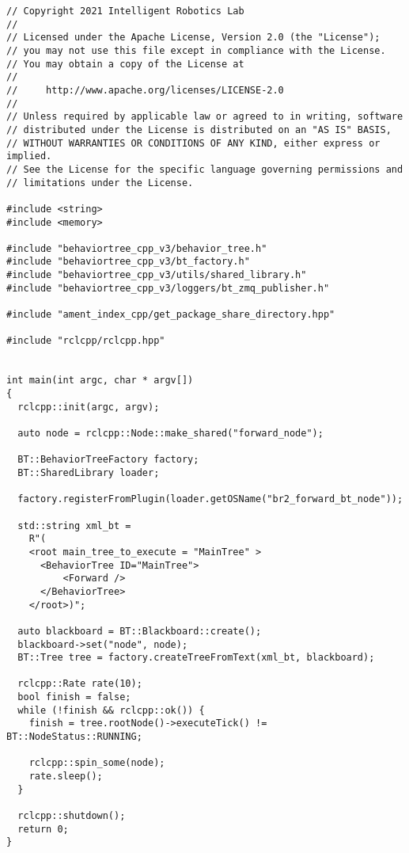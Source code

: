  \footnotesize
\begin{tcolorbox}[sharp corners, colframe=gray!80, colback=LightGray, left=0pt, top=0pt, bottom=0pt, title=\texttt{br2\_bt\_bumpgo/tests/bt\_forward\_main.cpp}]
  \begin{verbatim}
// Copyright 2021 Intelligent Robotics Lab
//
// Licensed under the Apache License, Version 2.0 (the "License");
// you may not use this file except in compliance with the License.
// You may obtain a copy of the License at
//
//     http://www.apache.org/licenses/LICENSE-2.0
//
// Unless required by applicable law or agreed to in writing, software
// distributed under the License is distributed on an "AS IS" BASIS,
// WITHOUT WARRANTIES OR CONDITIONS OF ANY KIND, either express or implied.
// See the License for the specific language governing permissions and
// limitations under the License.

#include <string>
#include <memory>

#include "behaviortree_cpp_v3/behavior_tree.h"
#include "behaviortree_cpp_v3/bt_factory.h"
#include "behaviortree_cpp_v3/utils/shared_library.h"
#include "behaviortree_cpp_v3/loggers/bt_zmq_publisher.h"

#include "ament_index_cpp/get_package_share_directory.hpp"

#include "rclcpp/rclcpp.hpp"


int main(int argc, char * argv[])
{
  rclcpp::init(argc, argv);

  auto node = rclcpp::Node::make_shared("forward_node");

  BT::BehaviorTreeFactory factory;
  BT::SharedLibrary loader;

  factory.registerFromPlugin(loader.getOSName("br2_forward_bt_node"));

  std::string xml_bt =
    R"(
    <root main_tree_to_execute = "MainTree" >
      <BehaviorTree ID="MainTree">
          <Forward />
      </BehaviorTree>
    </root>)";

  auto blackboard = BT::Blackboard::create();
  blackboard->set("node", node);
  BT::Tree tree = factory.createTreeFromText(xml_bt, blackboard);

  rclcpp::Rate rate(10);
  bool finish = false;
  while (!finish && rclcpp::ok()) {
    finish = tree.rootNode()->executeTick() != BT::NodeStatus::RUNNING;

    rclcpp::spin_some(node);
    rate.sleep();
  }

  rclcpp::shutdown();
  return 0;
}
    \end{verbatim}
    \end{tcolorbox}
  \normalsize



